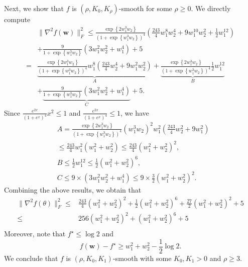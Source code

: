 \documentclass{article}
\newcommand{\Kr}{K_{\rho}}
\newcommand{\bw}{\mathbf{w}}
\begin{document}
Next, we show that $f$ is $(\rho,K_0,\Kr)$-smooth for some $\rho\geq 0$. We directly compute
 \begin{equation}\nonumber
\begin{aligned}
&\|\nabla^2 f(\bw)\|_F^2\leq \frac{\exp\left\{2w_1^3w_2\right\}}{\left(1+\exp\left\{w_1^3w_2\right\}\right)^4}\left(\frac{243}{4}w_1^8w_2^4+9w_1^{10}w_2^2+\frac{1}{2}w_1^{12}\right)\\
&+\frac{9}{1+\exp\left\{w_1^3w_2\right\}}\left(3w_1^2w_2^2+w_1^4\right)+5 \\
=&\underbrace{\frac{\exp\left\{2w_1^3w_2\right\}}{\left(1+\exp\left\{w_1^3w_2\right\}\right)^4}w_1^8\left(\frac{243}{4}w_2^4+9w_1^2w_2^2\right)}_{A}+\underbrace{\frac{\exp\left\{2w_1^3w_2\right\}}{\left(1+\exp\left\{w_1^3w_2\right\}\right)^4}\frac{1}{2}w_1^{12}}_{B}\\
&+\underbrace{\frac{9}{1+\exp\left\{w_1^3w_2\right\}}\left(3w_1^2w_2^2+w_1^4\right)}_{C} + 5.
\end{aligned}
\end{equation}
Since $\frac{e^{2x}}{(1+e^x)^4}x^2\leq 1$ and $\frac{e^{2x}}{(1+e^x)^4}\leq 1$, we have
\begin{align*}
    &A=\frac{\exp\left\{2w_1^3w_2\right\}}{\left(1+\exp\left\{w_1^3w_2\right\}\right)^4}\left(w_1^3w_2\right)^2w_1^2\left(\frac{243}{4}w_2^2+9w_1^2\right)\\
    &\leq \frac{243}{4}w_1^2(w_1^2+w_2^2)\leq \frac{243}{4}(w_1^2+w_2^2)^2,\\
    &B\leq \frac{1}{2}w_1^{12}\leq \frac{1}{2}(w_1^2+w_2^2)^6,\\
    &C\leq 9\times(3w_1^2w_2^2+w_1^4)\leq 9\times\frac{3}{2}(w_1^2+w_2^2)^2.
\end{align*}
Combining the above results, we obtain that
\begin{equation}\nonumber
    \begin{aligned}
        \|\nabla^2 f(\theta)\|_F^2\leq& \frac{243}{4}\left(w_1^2+w_2^2\right)^2+\frac{1}{2}(w_1^2+w_2^2)^6+\frac{27}{2}(w_1^2+w_2^2)^2+5\\
        \leq& 256\left(w_1^2+w_2^2\right)^2+\left(w_1^2+w_2^2\right)^6+5 \\
    \end{aligned}
\end{equation}
Moreover, note that $f^\star\leq \log 2$ and 
$$f(\bw)-f^\star\geq w_1^2+w_2^2-\frac{1}{2}\log 2.$$
We conclude that $f$ is $(\rho,K_0,K_1)$-smooth with some $K_0,K_1>0$ and $\rho\geq 3$.
\end{document}
